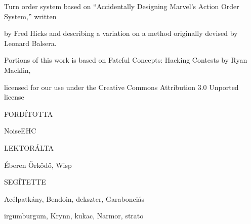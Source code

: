 \begin{center}
Turn order system based on “Accidentally Designing Marvel’s Action Order System,” written

by Fred Hicks and describing a variation on a method originally devised by Leonard Balsera.

Portions of this work is based on Fateful Concepts: Hacking Contests by Ryan Macklin,

licensed for our use under the Creative Commons Attribution 3.0 Unported license

\vspace{2em}

FORDÍTOTTA

NoiseEHC

LEKTORÁLTA

Éberen Őrködő, Wisp

SEGÍTETTE

Acélpatkány, Bendoin, dekszter, Garabonciás

irgumburgum, Krynn, kukac, Narmor, strato
\end{center}
